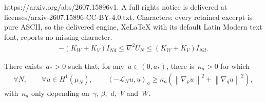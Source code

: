 \documentclass[10pt,a4paper]{amsart}
\renewcommand{\geq}{\geqslant}
\renewcommand{\leq}{\leqslant}
\newcommand{\mc}[1]{\mathcal{#1}}
\newcommand{\mescin}{\mu}
\newcommand{\norm}[1]{\left\lVert#1\right\rVert}
\newcommand{\slangle}[1]{\left\langle #1 \right\rangle}
\begin{document}
https://arxiv.org/abs/2607.15896v1. A full rights notice is delivered at licenses/arxiv-2607.15896-CC-BY-4.0.txt. Characters: every retained excerpt is pure ASCII, so the delivered engine, XeLaTeX with its default Latin Modern text font, reports no missing character.
    \begin{align}
        \label{eq:U_N_norm_sym_mat}
        -(K_W+K_V) I_{Nd} \leq \nabla^2 U_N \leq (K_W+K_V) I_{Nd}.
    \end{align}

\begin{lemma}
    \label{lem:born_inf_norm_H1}
    There exists~$a_*>0$ such that, for any~$a \in (0,a_*)$, there is~$\kappa_a >0$ for which
    \begin{align*}
        \forall N,\qquad \forall u\in H^1(\mescin_N),\qquad\slangle{-\mc{L}_N u ,u}_a \geq \kappa_a \left(\norm{\nabla_p u}^2+\norm{\nabla_q u}^2\right),
    \end{align*}
    with~$\kappa_a$ only depending on~$\gamma$, $\beta$,~$d$,~$V$ and~$W$.
\end{lemma}
\end{document}
